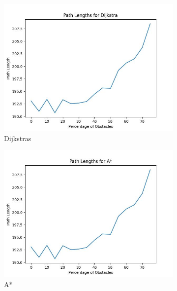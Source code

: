\documentclass{article}
\begin{document}
\begin{figure}[H]
\begin{subfigure}{0.325\textwidth}
        \includegraphics[width = \textwidth]{plots/Dijkstra_paths.jpg}
        \caption{Dijkstras}
    \end{subfigure}
    \begin{subfigure}{0.325\textwidth}
        \centering
        \includegraphics[width = \textwidth]{plots/A*_paths.jpg}
        \caption{A*}
    \end{subfigure}
    \begin{subfigure}{0.325\textwidth}
        \centering

\end{subfigure}
\end{figure}
\end{document}
